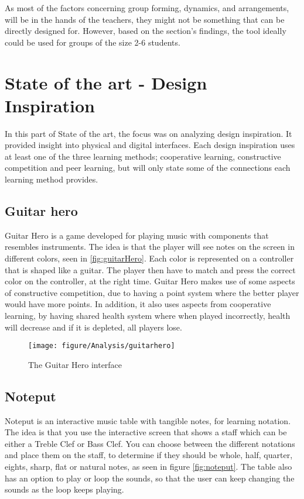 As most of the factors concerning group forming, dynamics, and arrangements,  will be in the hands of the teachers, they might not be something that can be directly designed for.  
However, based on the section's findings, the tool ideally could be used for groups of the size 2-6 students.
 

\newpage \section{State of the art - Design Inspiration}\label{sec:sota}
In this part of State of the art, the focus was on analyzing design inspiration. It provided insight into physical and digital interfaces. Each design inspiration uses at least one of the three learning methods; cooperative learning, constructive competition and peer learning, but will only state some of the connections each learning method provides.

\subsection{Guitar hero}\label{sec:guitarHero} 
Guitar Hero is a game developed for playing music with components that resembles instruments. The idea is that the player will see notes on the screen in different colors, seen in \autoref{fig:guitarHero}. Each color is represented on a controller that is shaped like a guitar.  The player then have to match and press the correct color on the controller, at the right time. Guitar Hero makes use of some aspects of constructive competition, due to having a point system where the better player would have more points. In addition, it also uses aspects from cooperative learning, by having shared health system where when played incorrectly, health will decrease and if it is depleted, all players lose.
 
\begin{figure}[H]
	\centering
	\texttt{[image: figure/Analysis/guitarhero]}
	\caption{The Guitar Hero interface}
	\label{fig:guitarHero}
\end{figure}

\subsection{Noteput} 
Noteput is an interactive music table with tangible notes, for learning notation. The idea is that you use the interactive screen that shows a staff which can be either a Treble Clef or Bass Clef. You can choose between the different notations and place them on the staff, to determine if they should be whole, half, quarter, eights, sharp, flat or natural notes, as seen in figure \autoref{fig:noteput}. The table also has an option to play or loop the sounds, so that the user can keep changing the sounds as the loop keeps playing. 

